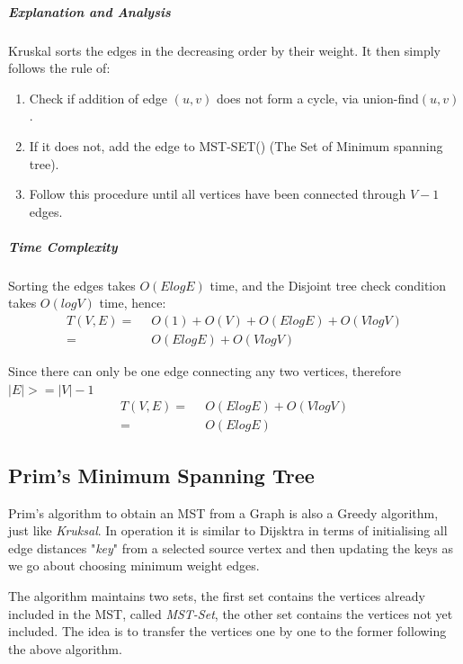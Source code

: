 \documentclass[11pt,a4paper]{extarticle}
\begin{document}
\begin{adjustwidth}{2.5em}{0pt}

\end{adjustwidth}

\subparagraph{Explanation and Analysis}
Kruskal sorts the edges in the decreasing order by their weight. It then simply follows the rule of:
\begin{enumerate}
	\item Check if addition of edge $(u,v)$ does not form a cycle, via union-find$(u,v)$.
	\item If it does not, add the edge to MST-SET() (The Set of Minimum spanning tree).
	\item Follow this procedure until all vertices have been connected through $V-1$ edges.
\end{enumerate}

\subparagraph{Time Complexity}
Sorting the edges takes $O(E logE)$ time, and the Disjoint tree check condition takes $O(logV)$ time, hence:
\begin{align}
T(V,E) =& \,\,\,O(1) + O(V) + O(E logE) + O(V logV)\\
	   =& \,\,\,O(E logE) + O(V logV)
\end{align}

\noindent
Since there can only be one edge connecting any two vertices, therefore $|E| >= |V|-1$
\begin{align}
T(V,E) =& \,\,\,O(E logE) + O(V logV)\\
	   =& \,\,\,O(E logE)
\end{align}

\subsection{Prim's Minimum Spanning Tree}
Prim's algorithm to obtain an MST from a Graph is also a Greedy algorithm, just like \textit{Kruksal}. In operation it is similar to Dijsktra in terms of initialising all edge distances "\textit{key}" from a selected source vertex and then updating the keys as we go about choosing minimum weight edges.

The algorithm maintains two sets, the first set contains the vertices already included in the MST, called \textit{MST-Set}, the other set contains the vertices not yet included. The idea is to transfer the vertices one by one to the former following the above algorithm.

\begin{adjustwidth}{2.5em}{0pt}

\end{adjustwidth}
\end{document}
